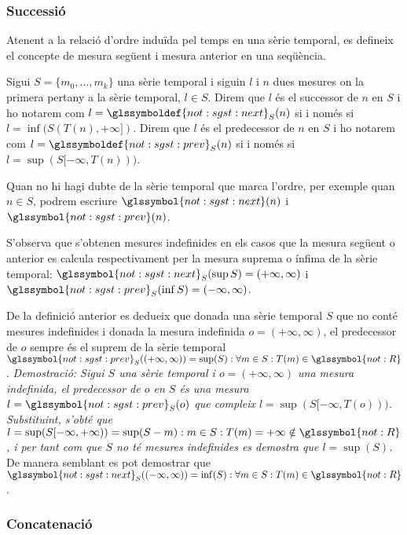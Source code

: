 \subsubsection{Successió}

Atenent a la relació d'ordre induïda pel temps en una sèrie temporal, es
defineix el concepte de mesura següent i mesura anterior en una
seqüència.


\begin{definition}\label{def:sgst:seg}\label{def:sgst:ant}
  Sigui $S=\{m_0, \ldots, m_k\}$ una sèrie temporal i siguin $l$ i $n$
  dues mesures on la primera pertany a la sèrie temporal, $l\in
  S$. Direm que $l$ és el successor de $n$ en $S$ i ho notarem com
  $l=\glssymboldef{not:sgst:next}_S(n)$ si i només si
  $l=\inf(S(T(n),+\infty])$.  Direm que $l$ és el predecessor de $n$
  en $S$ i ho notarem com $l=\glssymboldef{not:sgst:prev}_S(n)$ si i
  només si $l=\sup(S[-\infty,T(n)))$.

  Quan no hi hagi dubte de la sèrie temporal que marca l'ordre, per
  exemple quan $n\in S$, podrem escriure
  $\glssymbol{not:sgst:next}(n)$ i $\glssymbol{not:sgst:prev}(n)$.
\end{definition}

S'observa que s'obtenen mesures indefinides en els casos que la
mesura següent o anterior es calcula respectivament per la mesura
suprema o ínfima de la sèrie temporal: $\glssymbol{not:sgst:next}_S(\sup
S)=(+\infty,\infty)$ i $\glssymbol{not:sgst:prev}_S(\inf S)=(-\infty,\infty)$.

De la definició anterior es dedueix que donada una sèrie temporal $S$
que no conté mesures indefinides i donada la mesura indefinida
$o=(+\infty,\infty)$, el predecessor de $o$ sempre és el suprem de la
sèrie temporal $\glssymbol{not:sgst:prev}_S( (+\infty,\infty) ) =
\sup(S): \forall m\in S:
T(m)\in\glssymbol{not:R}$.  %
\emph{Demostració: Sigui $S$ una sèrie temporal i $o=(+\infty,\infty)$
  una mesura indefinida, el predecessor de $o$ en $S$ és una mesura
  $l=\glssymbol{not:sgst:prev}_S(o)$ que compleix
  $l=\sup(S[-\infty,T(o)))$. Substituint, s'obté que
  $l=\sup(S[-\infty,+\infty))=\sup(S-m):m\in S:T(m)=+\infty \notin
  \glssymbol{not:R}$, i per tant com que $S$ no té mesures indefinides es
  demostra que $l=\sup(S)$.  } De manera semblant es pot demostrar que
$\glssymbol{not:sgst:next}_S( (-\infty,\infty) ) = \inf(S): \forall
m\in S: T(m)\in\glssymbol{not:R}$.


\subsubsection{Concatenació}

